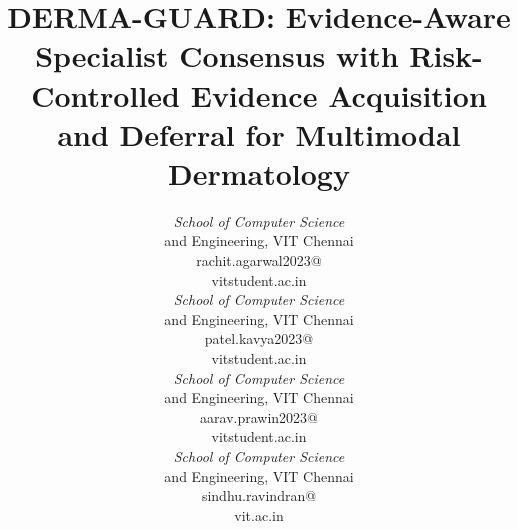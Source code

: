 \documentclass[conference]{IEEEtran}
\begin{document}
\title{DERMA-GUARD: Evidence-Aware Specialist Consensus with Risk-Controlled Evidence Acquisition and Deferral for Multimodal Dermatology}

\author{%
\parbox[t]{0.245\textwidth}{\par\vspace{2pt}
{\footnotesize\itshape School of Computer Science\par and Engineering, VIT Chennai\par}\vspace{1pt}
{\scriptsize rachit.agarwal2023@\par vitstudent.ac.in\par}}%
\hfill
\parbox[t]{0.245\textwidth}{\par\vspace{2pt}
{\footnotesize\itshape School of Computer Science\par and Engineering, VIT Chennai\par}\vspace{1pt}
{\scriptsize patel.kavya2023@\par vitstudent.ac.in\par}}%
\hfill
\parbox[t]{0.245\textwidth}{\par\vspace{2pt}
{\footnotesize\itshape School of Computer Science\par and Engineering, VIT Chennai\par}\vspace{1pt}
{\scriptsize aarav.prawin2023@\par vitstudent.ac.in\par}}%
\hfill
\parbox[t]{0.245\textwidth}{\par\vspace{2pt}
{\footnotesize\itshape School of Computer Science\par and Engineering, VIT Chennai\par}\vspace{1pt}
{\scriptsize sindhu.ravindran@\par vit.ac.in\par}}%
}

\maketitle
\end{document}
